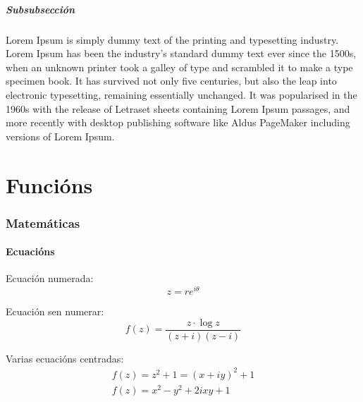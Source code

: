 \documentclass[12pt, a4paper, titlepage]{article}
\begin{document}
  \subsubsection{Subsubsección}

  Lorem Ipsum is simply dummy text of the printing and typesetting industry. Lorem Ipsum has been the industry's standard dummy text ever since the 1500s, when an unknown printer took a galley of type and scrambled it to make a type specimen book. It has survived not only five centuries, but also the leap into electronic typesetting, remaining essentially unchanged. It was popularised in the 1960s with the release of Letraset sheets containing Lorem Ipsum passages, and more recently with desktop publishing software like Aldus PageMaker including versions of Lorem Ipsum.


  \newpage
  \part{Funcións}

  \section{Matemáticas}

  \subsection{Ecuacións}

  Ecuación numerada:
  \begin{equation} \label{ec:test}
    z = r e^{i \theta}
  \end{equation}


  Ecuación sen numerar:
  \begin{equation*}
    f(z) = \frac{z \cdot \log{z}}{(z + i)(z - i)}
  \end{equation*}

  Varias ecuacións centradas:
  \begin{gather}
    f(z) = z^2 + 1 = (x + iy)^2 + 1 \nonumber \\ %
    f(z) = x^2 - y^2 + 2ixy + 1 \label{ec:test2}
  \end{gather}
\end{document}
